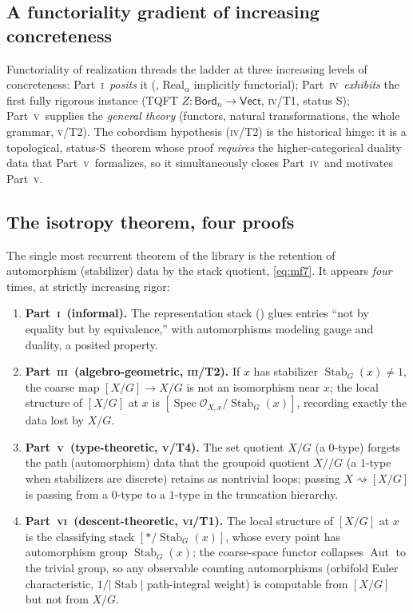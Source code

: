 \documentclass[12pt]{article}
\theoremstyle{definition}
\theoremstyle{remark}
\newcommand{\Vect}{\mathsf{Vect}}
\newcommand{\Bord}{\mathsf{Bord}}
\newcommand{\Real}{\mathrm{Real}}
\newcommand{\Aut}{\operatorname{Aut}}
\newcommand{\Stab}{\operatorname{Stab}}
\newcommand{\Spec}{\operatorname{Spec}}
\newcommand{\Sstat}{\textsf{S}}
\newcommand{\PI}{\textsc{i}}
\newcommand{\PIII}{\textsc{iii}}
\newcommand{\PIV}{\textsc{iv}}
\newcommand{\PV}{\textsc{v}}
\newcommand{\PVI}{\textsc{vi}}
\begin{document}
\subsection{A functoriality gradient of increasing concreteness}

Functoriality of realization threads the ladder at three increasing levels of concreteness:
Part~\PI\ \emph{posits} it (, $\Real_\alpha$ implicitly functorial);
Part~\PIV\ \emph{exhibits} the first fully rigorous instance (TQFT $Z:\Bord_n\to\Vect$,
\PIV/T1, status \Sstat); Part~\PV\ supplies the \emph{general theory} (functors,
natural transformations, the whole grammar, \PV/T2).  The cobordism hypothesis
(\PIV/T2) is the historical hinge: it is a topological, status-\Sstat\ theorem whose
proof \emph{requires} the higher-categorical duality data that Part~\PV\ formalizes, so
it simultaneously closes Part~\PIV\ and motivates Part~\PV.

\subsection{The isotropy theorem, four proofs}
\label{sec:isotropy}

The single most recurrent theorem of the library is the retention of automorphism
(stabilizer) data by the stack quotient, \eqref{eq:mf7}.  It appears \emph{four} times,
at strictly increasing rigor:

\begin{enumerate}[leftmargin=2.2em]
\item \textbf{Part~\PI\ (informal).}  The representation stack () glues
entries ``not by equality but by equivalence,'' with automorphisms modeling gauge and
duality, a posited property.
\item \textbf{Part~\PIII\ (algebro-geometric, \PIII/T2).}  If $x$ has stabilizer
$\Stab_G(x)\neq 1$, the coarse map $[X/G]\to X/G$ is not an isomorphism near $x$; the
local structure of $[X/G]$ at $x$ is $[\Spec\mathcal O_{X,x}/\Stab_G(x)]$, recording
exactly the data lost by $X/G$.
\item \textbf{Part~\PV\ (type-theoretic, \PV/T4).}  The set quotient $X/G$ (a
$0$-type) forgets the path (automorphism) data that the groupoid quotient $X/\!\!/G$
(a $1$-type when stabilizers are discrete) retains as nontrivial loops; passing
$X\rightsquigarrow[X/G]$ is passing from a $0$-type to a $1$-type in the truncation
hierarchy.
\item \textbf{Part~\PVI\ (descent-theoretic, \PVI/T1).}  The local structure of
$[X/G]$ at $x$ is the classifying stack $[\ast/\Stab_G(x)]$, whose every point has
automorphism group $\Stab_G(x)$; the coarse-space functor collapses $\Aut$ to the
trivial group, so any observable counting automorphisms (orbifold Euler characteristic,
$1/|\Stab|$ path-integral weight) is computable from $[X/G]$ but not from $X/G$.
\end{enumerate}
\end{document}
